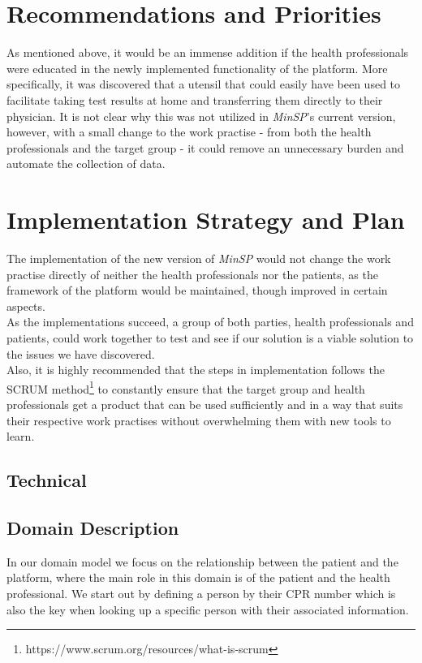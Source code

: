\documentclass[a4paper,11pt]{article}
\begin{document}
\section{Recommendations and Priorities}
As mentioned above, it would be an immense addition if the health professionals were educated in the newly implemented functionality of the platform. More specifically, it was discovered that a utensil that could easily have been used to facilitate taking test results at home and transferring them directly to their physician. It is not clear why this was not utilized in \textit{MinSP}'s current version, however, with a small change to the work practise - from both the health professionals and the target group - it could remove an unnecessary burden and automate the collection of data.


\section{Implementation Strategy and Plan}
The implementation of the new version of \textit{MinSP} would not change the work practise directly of neither the health professionals nor the patients, as the framework of the platform would be maintained, though improved in certain aspects.\\ 

As the implementations succeed, a group of both parties, health professionals and patients, could work together to test and see if our solution is a viable solution to the issues we have discovered.\\

Also, it is highly recommended that the steps in implementation follows the SCRUM method\footnote{https://www.scrum.org/resources/what-is-scrum} to constantly ensure that the target group and health professionals get a product that can be used sufficiently and in a way that suits their respective work practises without overwhelming them with new tools to learn.\\

\subsection{Technical}


\subsection{Domain Description}
\label{sec:domain_des}
In our domain model we focus on the relationship between the patient and the platform, where the main role in this domain is of the patient and the health professional. We start out by defining a person by their CPR number which is also the key when looking up a specific person with their associated information. \\
\end{document}
